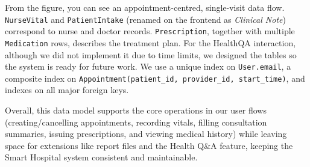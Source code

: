 From the figure, you can see an appointment-centred, single-visit data flow. \texttt{NurseVital} and \texttt{PatientIntake} (renamed on the frontend as \textit{Clinical Note}) correspond to nurse and doctor records. \texttt{Prescription}, together with multiple \texttt{Medication} rows, describes the treatment plan. For the HealthQA interaction, although we did not implement it due to time limits, we designed the tables so the system is ready for future work. We use a unique index on \texttt{User.email}, a composite index on \texttt{Appointment(patient\_id, provider\_id, start\_time)}, and indexes on all major foreign keys. 

Overall, this data model supports the core operations in our user flows (creating/cancelling appointments, recording vitals, filling consultation summaries, issuing prescriptions, and viewing medical history) while leaving space for extensions like report files and the Health Q\&A feature, keeping the Smart Hospital system consistent and maintainable.
